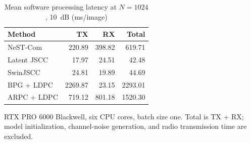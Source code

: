 \begin{table}[t]
\centering
\caption{Mean software processing latency at $N=1024$, 10~dB (ms/image)}
\label{tab:latency}
\begingroup
\footnotesize
\setlength{\tabcolsep}{3pt}
\renewcommand{\arraystretch}{1.15}
\begin{tabular}{@{}lrrr@{}}
\toprule
Method & TX & RX & Total \\
\midrule
NeST-Com & 220.89 & 398.82 & 619.71 \\[3pt]
Latent JSCC & 17.97 & 24.51 & 42.48 \\[3pt]
SwinJSCC & 24.81 & 19.89 & 44.69 \\[3pt]
BPG + LDPC & 2269.87 & 23.15 & 2293.01 \\[3pt]
ARPC + LDPC & 719.12 & 801.18 & 1520.30 \\
\bottomrule
\end{tabular}
\endgroup
\par\smallskip
\begin{minipage}{\columnwidth}\footnotesize
RTX PRO 6000 Blackwell, six CPU cores, batch size one. Total is TX + RX; model initialization, channel-noise generation, and radio transmission time are excluded.
\end{minipage}
\end{table}
